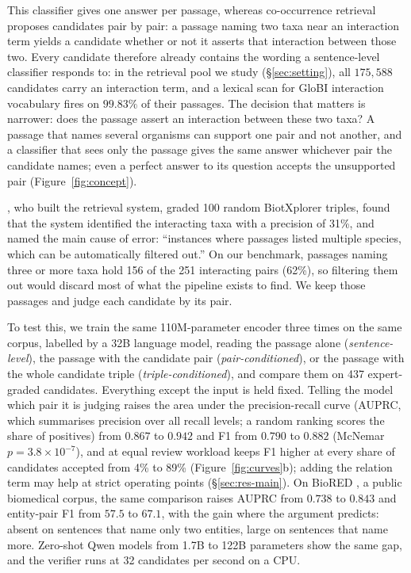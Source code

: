 \documentclass[11pt]{article}
\begin{document}
This classifier gives one answer per passage, whereas co-occurrence retrieval proposes candidates pair by pair: a
passage naming two taxa near an interaction term yields a candidate whether or not it asserts that
interaction between those two. Every candidate therefore already contains the wording a sentence-level classifier responds to: in the retrieval pool we study
(\S\ref{sec:setting}), all $175{,}588$ candidates carry an interaction term, and a lexical scan for
GloBI interaction vocabulary fires on $99.83\%$ of their passages. The decision that matters is narrower: does the passage assert an interaction between these two taxa? A passage that
names several organisms can support one pair and not another, and a classifier that sees only the
passage gives the same answer whichever pair the candidate names; even a perfect answer to its
question accepts the unsupported pair (Figure~\ref{fig:concept}).

\citet{ruch2024biotxplorer}, who built the retrieval system, graded 100
random BiotXplorer triples, found that the system identified the interacting taxa with a
precision of 31\%, and named the main cause of error: ``instances where passages listed multiple
species, which can be automatically filtered out.'' On our benchmark, passages naming three or more
taxa hold 156 of the 251 interacting pairs (62\%), so filtering them out would discard most of what
the pipeline exists to find. We keep those passages and judge each candidate by its pair.

To test this, we train the same 110M-parameter encoder three times on the same
corpus, labelled by a 32B language model, reading the passage alone (\emph{sentence-level}), the passage
with the candidate pair (\emph{pair-conditioned}), or the passage with the whole candidate triple
(\emph{triple-conditioned}), and compare them on 437 expert-graded candidates. Everything except the input is held fixed. Telling the model which pair it is judging raises the area under the
precision-recall curve (AUPRC, which summarises precision over all recall levels; a random ranking
scores the share of positives) from $0.867$ to $0.942$ and F1 from $0.790$ to $0.882$ (McNemar
$p = 3.8\times10^{-7}$), and at equal review workload keeps F1 higher at every share of candidates accepted from 4\% to 89\% (Figure~\ref{fig:curves}b); adding the relation term
may help at strict operating points (\S\ref{sec:res-main}). On BioRED \citep{luo2022biored}, a public biomedical corpus, the same comparison raises
AUPRC from $0.738$ to $0.843$ and entity-pair F1 from $57.5$ to $67.1$, with the gain where the
argument predicts: absent on sentences that name only two entities, large on sentences that name
more. Zero-shot Qwen models from 1.7B to 122B parameters show the same gap, and the verifier runs
at 32 candidates per second on a CPU.
\end{document}
